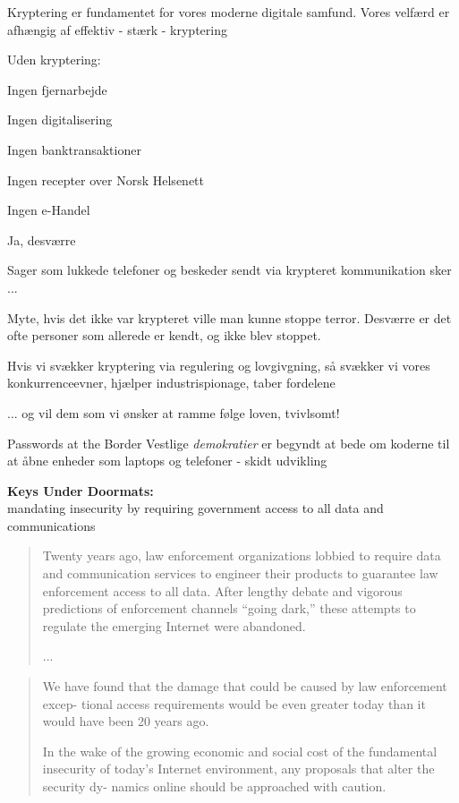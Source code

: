 \documentclass[20pt,landscape,a4paper,footrule]{foils}
\begin{document}

Kryptering er fundamentet for vores moderne digitale samfund. Vores velfærd er afhængig af effektiv - stærk - kryptering

Uden kryptering:
\begin{list2}
\item Ingen fjernarbejde
\item Ingen digitalisering
\item Ingen banktransaktioner
\item Ingen recepter over Norsk Helsenett
\item Ingen e-Handel
\end{list2}


Ja, desværre

Sager som lukkede telefoner og beskeder sendt via krypteret kommunikation sker ...

Myte, hvis det ikke var krypteret ville man kunne stoppe terror. Desværre er det ofte personer som allerede er kendt, og ikke blev stoppet.

Hvis vi svækker kryptering via regulering og lovgivgning, så svækker vi vores konkurrenceevner, hjælper industrispionage, taber fordelene

... og vil dem som vi ønsker at ramme følge loven, tvivlsomt!


Passwords at the Border
Vestlige \emph{demokratier} er begyndt at bede om koderne til at åbne enheder som laptops og telefoner - skidt udvikling

{\bf Keys Under Doormats:}\\
mandating insecurity by requiring government access to all
data and communications

\begin{quote}
Twenty years ago, law enforcement organizations lobbied to require data and
communication services to engineer their products to guarantee law enforcement
access to all data. After lengthy debate and vigorous predictions of enforcement
channels “going dark,” these attempts to regulate the emerging Internet were abandoned.

...
\end{quote}


\begin{quote}
We have found that the damage that could be caused by law enforcement excep-
tional access requirements would be even greater today than it would have been 20
years ago.

In the wake of the growing economic and social cost of the fundamental
insecurity of today’s Internet environment, any proposals that alter the security dy-
namics online should be approached with caution.
\end{quote}
\end{document}
